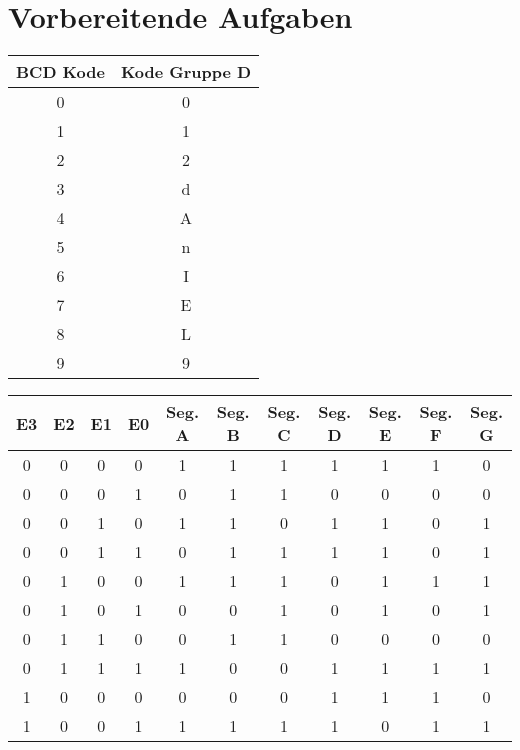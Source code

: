 \documentclass[a4paper, 11pt, fleqn, DIV=10, twoside, BCOR=10mm]{scrreprt}
\begin{document}
 
\AVier
\chapter{Vorbereitende Aufgaben}
\begin{center}
\begin{tabular}{c|c}
BCD Kode&Kode Gruppe D\\
\hline
0&0\\
1&1\\
2&2\\
3&d\\
4&A\\
5&n\\
6&I\\
7&E\\
8&L\\
9&9\\
\end {tabular}
\begin{tabular}{c|c|c|c||c|c|c|c|c|c|c}
E3&E2&E1&E0&Seg. A&Seg. B&Seg. C&Seg. D&Seg. E&Seg. F&Seg. G\\
\hline
0&0&0&0&1&1&1&1&1&1&0\\
0&0&0&1&0&1&1&0&0&0&0\\
0&0&1&0&1&1&0&1&1&0&1\\
0&0&1&1&0&1&1&1&1&0&1\\
0&1&0&0&1&1&1&0&1&1&1\\
0&1&0&1&0&0&1&0&1&0&1\\
0&1&1&0&0&1&1&0&0&0&0\\
0&1&1&1&1&0&0&1&1&1&1\\
1&0&0&0&0&0&0&1&1&1&0\\
1&0&0&1&1&1&1&1&0&1&1\\
\end{tabular}
\end{center}


\end{document}
